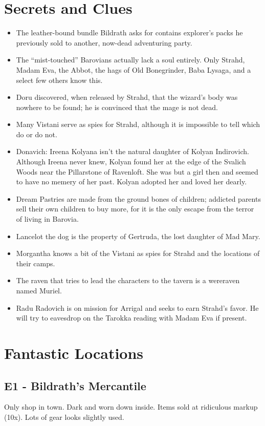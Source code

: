 \documentclass[a4paper,11pt]{article}
\begin{document}
\section{Secrets and Clues}
\label{sec:SecretsAndClues}
\begin{itemize}
  \item The leather-bound bundle Bildrath asks for contains explorer's packs he previously sold to another,
  now-dead adventuring party.
  \item The ``mist-touched'' Barovians actually lack a soul entirely. Only Strahd, Madam Eva, the Abbot, the hags
  of Old Bonegrinder, Baba Lysaga, and a select few others know this.
  \item Doru discovered, when released by Strahd, that the wizard's body was nowhere to be found; he is 
  convinced that the mage is not dead.
  \item Many Vistani serve as spies for Strahd, although it is impossible to tell which do or do not.
  \item Donavich: Ireena Kolyana isn't the natural daughter of Kolyan Indirovich. Although Ireena never knew, 
  Kolyan found her at the edge of the Svalich Woods near the Pillarstone of Ravenloft. She was but a girl then 
  and seemed to have no memery of her past. Kolyan adopted her and loved her dearly.
  \item Dream Pastries are made from the ground bones of children; addicted parents sell their own children to 
  buy more, for it is the only escape from the terror of living in Barovia.
  \item Lancelot the dog is the property of Gertruda, the lost daughter of Mad Mary.
  \item Morgantha knows a bit of the Vistani as spies for Strahd and the locations of their camps.
  \item The raven that tries to lead the characters to the tavern is a wereraven named Muriel.
  \item Radu Radovich is on mission for Arrigal and seeks to earn Strahd's favor. He will try to eavesdrop on 
  the Tarokka reading with Madam Eva if present.
\end{itemize}

\section{Fantastic Locations}
\label{sec:FantasticLocations}
\subsection{E1 - Bildrath's Mercantile}
  Only shop in town. Dark and worn down inside. Items sold at ridiculous markup (10x). Lots of gear looks 
  slightly used.
\end{document}
